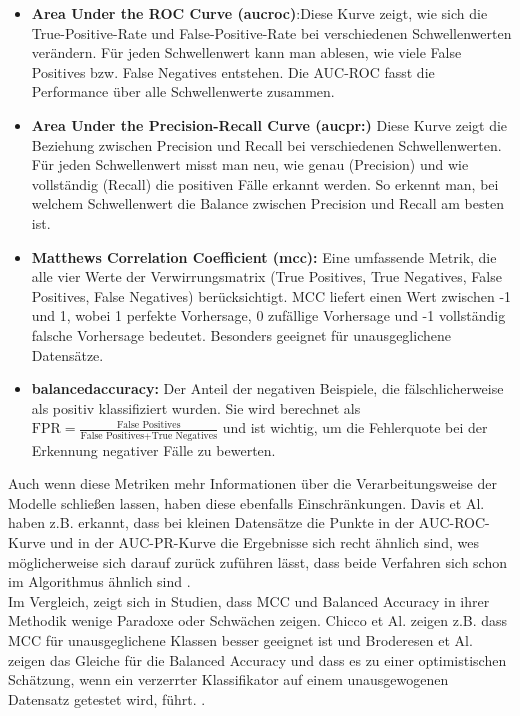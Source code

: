 \documentclass[a4paper,12pt]{article}
\begin{document}
	\begin{itemize}
		\item \textbf{Area Under the ROC Curve (\gls{aucroc})}:Diese Kurve zeigt, wie sich die True-Positive-Rate und False-Positive-Rate bei verschiedenen Schwellenwerten verändern. Für jeden Schwellenwert kann man ablesen, wie viele False Positives bzw. False Negatives entstehen. Die AUC-ROC fasst die Performance über alle Schwellenwerte zusammen.
		\item \textbf{Area Under the Precision-Recall Curve (\gls{aucpr}:)} Diese Kurve zeigt die Beziehung zwischen Precision und Recall bei verschiedenen Schwellenwerten. Für jeden Schwellenwert misst man neu, wie genau (Precision) und wie vollständig (Recall) die positiven Fälle erkannt werden. So erkennt man, bei welchem Schwellenwert die Balance zwischen Precision und Recall am besten ist.
		\item \textbf{Matthews Correlation Coefficient (\gls{mcc}):} Eine umfassende Metrik, die alle vier Werte der Verwirrungsmatrix (True Positives, True Negatives, False Positives, False Negatives) berücksichtigt. MCC liefert einen Wert zwischen -1 und 1, wobei 1 perfekte Vorhersage, 0 zufällige Vorhersage und -1 vollständig falsche Vorhersage bedeutet. Besonders geeignet für unausgeglichene Datensätze.
		\item \textbf{\gls{balancedaccuracy}:} Der Anteil der negativen Beispiele, die fälschlicherweise als positiv klassifiziert wurden. Sie wird berechnet als \(\text{FPR} = \frac{\text{False Positives}}{\text{False Positives} + \text{True Negatives}}\) und ist wichtig, um die Fehlerquote bei der Erkennung negativer Fälle zu bewerten.
	\end{itemize}
	Auch wenn diese Metriken  mehr Informationen über die Verarbeitungsweise der Modelle schließen lassen, haben diese ebenfalls Einschränkungen. Davis et Al. haben z.B. erkannt, dass bei kleinen Datensätze die Punkte in der AUC-ROC-Kurve und in der AUC-PR-Kurve die Ergebnisse sich recht ähnlich sind, wes möglicherweise sich darauf zurück zuführen lässt, dass beide Verfahren sich schon im Algorithmus ähnlich sind \cite{davis2006relationship}.
	\\[0.5em]
	Im Vergleich, zeigt sich in Studien, dass MCC und Balanced Accuracy in ihrer Methodik wenige Paradoxe oder Schwächen zeigen. Chicco et Al. zeigen z.B. dass MCC für unausgeglichene Klassen besser geeignet ist und Broderesen et Al. zeigen das Gleiche für die Balanced Accuracy und dass es zu einer optimistischen Schätzung, wenn ein verzerrter Klassifikator auf einem unausgewogenen Datensatz getestet wird, führt. \cite{chicco2020advantages, brodersen2010balanced}.
\end{document}
